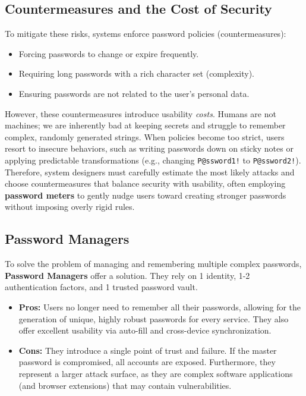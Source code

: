 \subsection{Countermeasures and the Cost of Security}
To mitigate these risks, systems enforce password policies (countermeasures):
\begin{itemize}
    \item Forcing passwords to change or expire frequently.
    \item Requiring long passwords with a rich character set (complexity).
    \item Ensuring passwords are not related to the user's personal data.
\end{itemize}

However, these countermeasures introduce usability \textit{costs}. Humans are not machines; we are inherently bad at keeping secrets and struggle to remember complex, randomly generated strings. When policies become too strict, users resort to insecure behaviors, such as writing passwords down on sticky notes or applying predictable transformations (e.g., changing \texttt{P@ssword1!} to \texttt{P@ssword2!}). Therefore, system designers must carefully estimate the most likely attacks and choose countermeasures that balance security with usability, often employing \textbf{password meters} to gently nudge users toward creating stronger passwords without imposing overly rigid rules.

\subsection{Password Managers}
To solve the problem of managing and remembering multiple complex passwords, \textbf{Password Managers} offer a solution. They rely on 1 identity, 1-2 authentication factors, and 1 trusted password vault.
\begin{itemize}
    \item \textbf{Pros:} Users no longer need to remember all their passwords, allowing for the generation of unique, highly robust passwords for every service. They also offer excellent usability via auto-fill and cross-device synchronization.
    \item \textbf{Cons:} They introduce a single point of trust and failure. If the master password is compromised, all accounts are exposed. Furthermore, they represent a larger attack surface, as they are complex software applications (and browser extensions) that may contain vulnerabilities.
\end{itemize}

